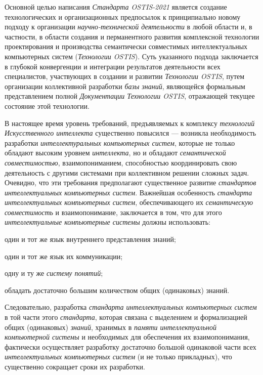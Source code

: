 \begin{SCn}
{\begin{scnitemize}
		Основной целью написания \textit{Стандарта OSTIS-2021} является создание технологических и организационных предпосылок к принципиально новому  подходу к организации \textit{научно-технической деятельности} в любой области и, в частности, в области создания и перманентного развития комплексной технологии проектирования и производства семантически совместимых интеллектуальных компьютерных систем (\textit{Технологии OSTIS}). Суть указанного подхода заключается  в глубокой конвергенции и интеграции результатов деятельности всех специалистов, участвующих в создании и развитии \textit{Технологии OSTIS}, путем организации коллективной разработки \textit{базы знаний}, являющейся формальным представлением полной \textit{Документации Технологии OSTIS}, отражающей текущее состояние этой технологии.
	\end{scnitemize}
В настоящее время уровень требований, предъявляемых к комплексу \textit{технологий Искусственного интеллекта} существенно повысился --- возникла необходимость разработки \textit{интеллектуральных компьютерных систем}, которые не только обладают высоким уровнем \textit{интеллекта}, но и обладают \textit{семантической совместимостью}, взаимопониманием, способностью координировать свою деятельность с другими системами при коллективном решении сложных  задач. Очевидно, что эти требования предполагают существенное развитие  \textit{стандартов интеллектуальных компьютерных систем}. Важнейшая особенность \textit{стандарта интеллектуальных компьютерных систем}, обеспечивающего их \textit{семантическую совместимость} и взаимопонимание, заключается в том, что для этого \textit{интеллектуальные компьютерные системы} должны использовать:
\begin{scnitemize}
	\item   один и тот же язык внутреннего представления знаний;
	\item   один и тот же язык их коммуникации;
	\item   одну и ту же \textit{систему понятий};
	\item   обладать достаточно большим количеством  общих (одинаковых) знаний.
\end{scnitemize}

Следовательно, разработка \textit{стандарта интеллектуальных компьютерных систем} в той части этого \textit{стандарта}, которая связана с выделением и формализацией общих (одинаковых) \textit{знаний}, хранимых в \textit{памяти интеллектуальной компьютерной системы} и необходимых для обеспечения их взаимопонимания, фактически осуществляет разработку достаточно большой  одинаковой части всех \textit{интеллектуальных компьютерных систем} (и не только прикладных),  что существенно  сокращает сроки их разработки.

}
\end{SCn}
